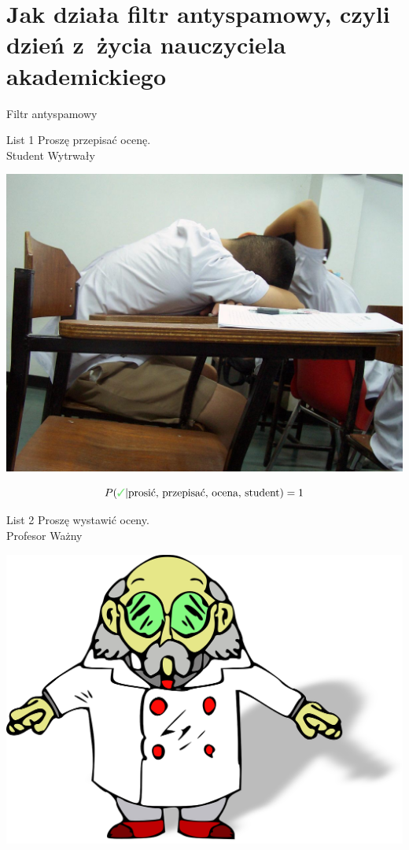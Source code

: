 \documentclass{mp}
\begin{document}
\part{Jak działa filtr antyspamowy, czyli dzień z~życia nauczyciela akademickiego}
\frame{\partpage}
\begin{frame}{Filtr antyspamowy}
{
	\begin{minipage}{.50\textwidth}
\begin{block}{List 1}
Proszę przepisać ocenę.\\
Student Wytrwały
\end{block}
\end{minipage}
\hfill
\begin{minipage}{.45\textwidth}
\includegraphics[width=\textwidth]{bayes/Sleeping_students.jpg}\\
\end{minipage}
\[ P(\cmark | \text{prosić, przepisać, ocena, student})=1 \]
}
{
	\begin{minipage}{.50\textwidth}
\begin{block}{List 2}
Proszę wystawić oceny.\\
Profesor Ważny
\end{block}
\end{minipage}
\hfill
\begin{minipage}{.45\textwidth}
\includegraphics[width=\textwidth]{bayes/scientist-28748_1280.png}\\

\end{minipage}}
\end{frame}
\end{document}
